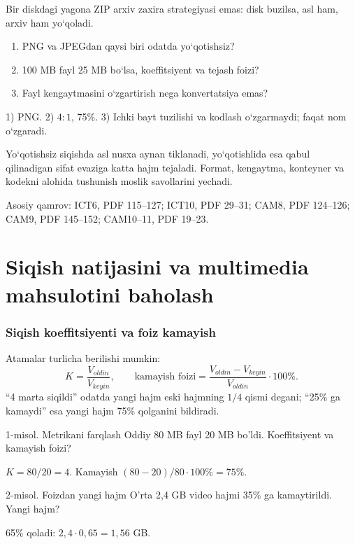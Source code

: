 \documentclass[11pt,a4paper,oneside]{book}
\newcommand{\difficulty}[1]{\hfill\textcolor{Muted}{\scriptsize\sffamily #1}}
\newcommand{\quickcheck}[1]{\begin{tcolorbox}[colback=white,colframe=Teal,boxrule=.55pt,title={Tezkor tekshiruv}]#1\end{tcolorbox}}
\newcommand{\answers}[1]{\begin{tcolorbox}[colback=Paper,colframe=Muted,boxrule=.4pt,title={Javob va izoh}]\small #1\end{tcolorbox}}
\begin{document}
Bir diskdagi yagona ZIP arxiv zaxira strategiyasi emas: disk buzilsa,
asl ham, arxiv ham yo‘qoladi.

\quickcheck{
\begin{enumerate}
  \item PNG va JPEGdan qaysi biri odatda yo‘qotishsiz?
  \item 100 MB fayl 25 MB bo‘lsa, koeffitsiyent va tejash foizi?
  \item Fayl kengaytmasini o‘zgartirish nega konvertatsiya emas?
\end{enumerate}}

\answers{
1) PNG. 2) \(4:1\), 75\%. 3) Ichki bayt tuzilishi va kodlash
o‘zgarmaydi; faqat nom o‘zgaradi.}

\begin{summarybox}
Yo‘qotishsiz siqishda asl nusxa aynan tiklanadi, yo‘qotishlida esa
qabul qilinadigan sifat evaziga katta hajm tejaladi. Format, kengaytma,
konteyner va kodekni alohida tushunish moslik savollarini yechadi.
\end{summarybox}

\begin{sourcebox}
Asosiy qamrov: ICT6, PDF 115–127; ICT10, PDF 29–31;
CAM8, PDF 124–126; CAM9, PDF 145–152; CAM10–11, PDF 19–23.
\end{sourcebox}
\section{Siqish natijasini va multimedia mahsulotini baholash}
\subsubsection{Siqish koeffitsiyenti va foiz kamayish}
Atamalar turlicha berilishi mumkin:
\[
K=\frac{V_{oldin}}{V_{keyin}},\qquad
\text{kamayish foizi}=\frac{V_{oldin}-V_{keyin}}{V_{oldin}}\cdot100\%.
\]
“4 marta siqildi” odatda yangi hajm eski hajmning $1/4$ qismi degani; “25\% ga kamaydi” esa yangi hajm 75\% qolganini bildiradi.

\begin{examplebox}{1-misol. Metrikani farqlash \difficulty{Oddiy}}
80 MB fayl 20 MB bo'ldi. Koeffitsiyent va kamayish foizi?
\begin{solutionbox}
$K=80/20=4$. Kamayish $(80-20)/80\cdot100\%=75\%$.
\end{solutionbox}
\end{examplebox}

\begin{examplebox}{2-misol. Foizdan yangi hajm \difficulty{O'rta}}
2,4 GB video hajmi 35\% ga kamaytirildi. Yangi hajm?
\begin{solutionbox}
65\% qoladi: $2,4\cdot0,65=1,56$ GB.
\end{solutionbox}
\end{examplebox}
\end{document}
